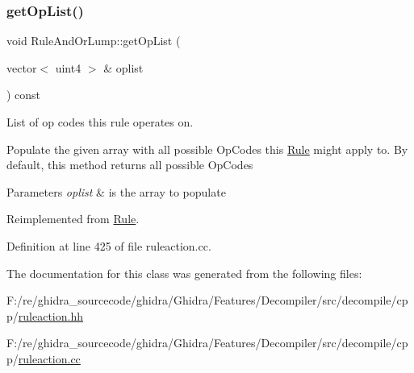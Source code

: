 \subsubsection{\texorpdfstring{getOpList()}{getOpList()}}
{\footnotesize\ttfamily void Rule\+And\+Or\+Lump\+::get\+Op\+List (\begin{DoxyParamCaption}\item[{vector$<$ uint4 $>$ \&}]{oplist }\end{DoxyParamCaption}) const\hspace{0.3cm}{\ttfamily [virtual]}}



List of op codes this rule operates on. 

Populate the given array with all possible Op\+Codes this \mbox{\hyperlink{class_rule}{Rule}} might apply to. By default, this method returns all possible Op\+Codes 
\begin{DoxyParams}{Parameters}
{\em oplist} & is the array to populate \\
\hline
\end{DoxyParams}


Reimplemented from \mbox{\hyperlink{class_rule_a4023bfc7825de0ab866790551856d10e}{Rule}}.



Definition at line 425 of file ruleaction.\+cc.



The documentation for this class was generated from the following files\+:\begin{DoxyCompactItemize}
\item 
F\+:/re/ghidra\+\_\+sourcecode/ghidra/\+Ghidra/\+Features/\+Decompiler/src/decompile/cpp/\mbox{\hyperlink{ruleaction_8hh}{ruleaction.\+hh}}\item 
F\+:/re/ghidra\+\_\+sourcecode/ghidra/\+Ghidra/\+Features/\+Decompiler/src/decompile/cpp/\mbox{\hyperlink{ruleaction_8cc}{ruleaction.\+cc}}\end{DoxyCompactItemize}
